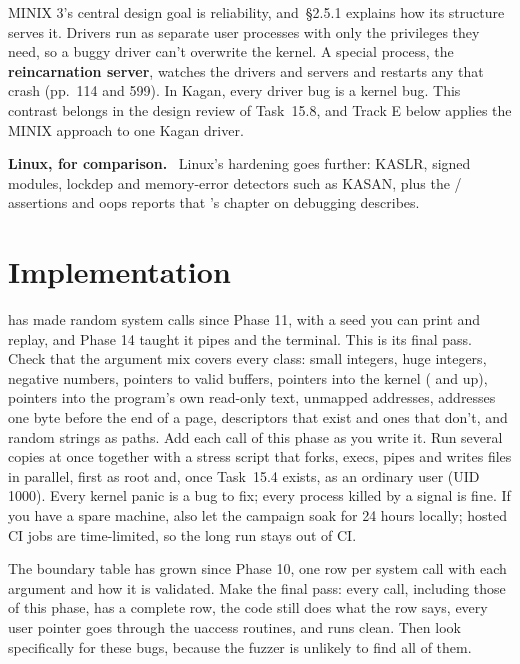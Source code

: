 \documentclass[11pt,a4paper]{article}
\begin{document}
\begin{minixbox}
MINIX 3's central design goal is reliability, and \OSDI\,\S2.5.1 explains how its structure serves it. Drivers run
as separate user processes with only the privileges they need, so a buggy driver can't overwrite the kernel. A
special process, the \textbf{reincarnation server}, watches the drivers and servers and restarts any that crash
(\OSDI pp.~114 and 599). In Kagan, every driver bug is a kernel bug. This contrast belongs in the design review of Task~15.8,
and Track E below applies the MINIX approach to one Kagan driver.

\par\smallskip\textbf{Linux, for comparison.} \LKD\ \LKP Linux's hardening goes further: KASLR, signed modules, lockdep and memory-error detectors such as KASAN, plus the / assertions and oops reports that \LKD's chapter on debugging describes.
\end{minixbox}

\section{Implementation}

 has made random system calls since Phase 11, with a seed you can print and replay, and Phase 14
taught it pipes and the terminal. This is its final pass. Check that the argument mix covers every class: small
integers, huge integers, negative numbers, pointers to valid buffers, pointers into the kernel ( and
up), pointers into the program's own read-only text, unmapped addresses, addresses one byte before the end of a page,
descriptors that exist and ones that don't, and random strings as paths. Add each call of this phase as you write it.
Run several copies at once together with a stress script that forks, execs, pipes and writes files in parallel, first
as root and, once Task~15.4 exists, as an ordinary user (UID 1000). Every kernel panic is a bug to fix; every process
killed by a signal is fine. If you have a spare machine, also let the campaign soak for 24 hours locally; hosted CI
jobs are time-limited, so the long run stays out of CI.

The boundary table  has grown since Phase 10, one row per system call with each
argument and how it is validated. Make the final pass: every call, including those of this phase, has a complete row,
the code still does what the row says, every user pointer goes through the uaccess routines, and  runs
clean. Then look specifically for these bugs, because the fuzzer is unlikely to find all of them.
\end{document}
